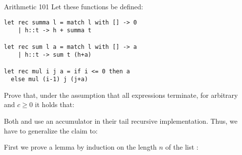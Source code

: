 \documentclass[
  english
]{tumteaching}
\begin{document}
\begin{assignment}[L]{Arithmetic 101}
  Let these functions be defined:
  \begin{verbatim}
let rec summa l = match l with [] -> 0
    | h::t -> h + summa t

let rec sum l a = match l with [] -> a
    | h::t -> sum t (h+a)

let rec mul i j a = if i <= 0 then a
  else mul (i-1) j (j+a)
  \end{verbatim}
  Prove that, under the assumption that all expressions terminate, for arbitrary  and $c \geq 0$ it holds that:
  \begin{center}
  \end{center}

  \begin{solution}
    Both  and  use an accumulator in their tail recursive implementation. Thus, we have to generalize the claim to:
    \begin{center}
    \end{center}
    First we prove a lemma by induction on the length $n$ of the list :


\end{solution}
\end{assignment}
\end{document}
